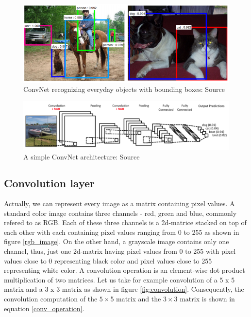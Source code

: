 \documentclass[master]{thesis-uestc}
\begin{document}
\begin{figure}[ht]
\includegraphics[width=5in]{pic/everyday_objects.PNG}
\caption{ConvNet recognizing everyday objects with bounding boxes: Source \cite{DBLP:journals/corr/RenHG015}}
\label{everyday_objects}
\end{figure}

\begin{figure}[ht]
\includegraphics[width=5in]{pic/ConvNet_Arch.png}
\caption{A simple ConvNet architecture: Source \cite{intuitiveCNN}}
\label{ConvNet_arch}
\end{figure}

\subsection{Convolution layer}
Actually, we can represent every image as a matrix containing pixel values. A standard color image contains three channels - red, green and blue, commonly refered to as RGB. Each of these three channels is a 2d-matrice stacked on top of each other with each containing pixel values ranging from 0 to 255 as shown in figure \ref{rgb_image}. On the other hand, a grayscale image contains only one channel, thus, just one 2d-matrix having pixel values from 0 to 255 with pixel values close to 0 representing black color and pixel values close to 255 representing white color. A convolution operation is an element-wise dot product multiplication of two matrices. Let us take for example convolution of a 5 x 5 matrix and a 3 x 3 matrix as shown in figure \ref{fig:convolution}. Consequently, the convolution computation of the $5 \times $5 matrix and the $3 \times $3 matrix is shown in equation \ref{conv_operation}.
\end{document}
